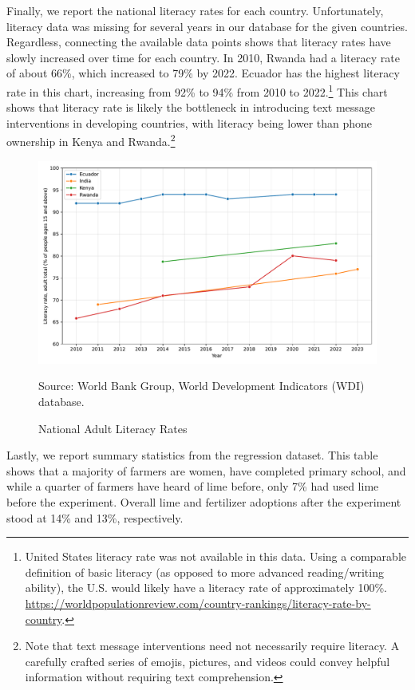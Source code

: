 \documentclass[12pt]{article}
\begin{document}
Finally, we report the national literacy rates for each country. Unfortunately, literacy data was missing for several years in our database for the given countries. Regardless, connecting the available data points shows that literacy rates have slowly increased over time for each country. In 2010, Rwanda had a literacy rate of about 66\%, which increased to 79\% by 2022. Ecuador has the highest literacy rate in this chart, increasing from 92\% to 94\% from 2010 to 2022.\footnote{United States literacy rate was not available in this data. Using a comparable definition of basic literacy (as opposed to more advanced reading/writing ability), the U.S. would likely have a literacy rate of approximately 100\%. \url{https://worldpopulationreview.com/country-rankings/literacy-rate-by-country}.} This chart shows that literacy rate is likely the bottleneck in introducing text message interventions in developing countries, with literacy being lower than phone ownership in Kenya and Rwanda.\footnote{Note that text message interventions need not necessarily require literacy. A carefully crafted series of emojis, pictures, and videos could convey helpful information without requiring text comprehension.}

\begin{figure}[H]
    \centering
    \caption{National Adult Literacy Rates}
    \includegraphics[width=\textwidth]{../output/literacy_rate.pdf}
    \begin{minipage}{0.9\textwidth}
    \footnotesize
    Source: World Bank Group, World Development Indicators (WDI) database. 
    \end{minipage}
    \label{fig:literacy_rate}
\end{figure}

Lastly, we report summary statistics from the regression dataset. This table shows that a majority of farmers are women, have completed primary school, and while a quarter of farmers have heard of lime before, only 7\% had used lime before the experiment. Overall lime and fertilizer adoptions after the experiment stood at 14\% and 13\%, respectively.
\end{document}

